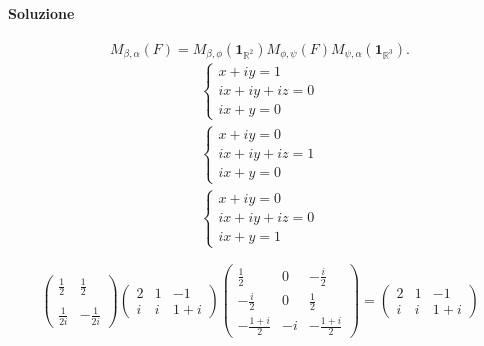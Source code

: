 \documentclass{article}
\theoremstyle{plain}
\theoremstyle{definition}
\theoremstyle{remark}
\begin{document}
\paragraph{Soluzione}
\[M_{\beta,\alpha}(F)=M_{\beta,\phi}(\mathbf{1}_{\mathbb{R}^2})M_{\phi,\psi}(F)M_{\psi,\alpha}(\mathbf{1}_{\mathbb{R}^3}).\]
\begin{align*}
\begin{cases}
    x+iy=1\\
    ix+iy+iz=0\\
    ix+y=0
\end{cases}\\
\begin{cases}
    x+iy=0\\
    ix+iy+iz=1\\
    ix+y=0
\end{cases}\\
\begin{cases}
    x+iy=0\\
    ix+iy+iz=0\\
    ix+y=1
\end{cases}    
\end{align*}

\[
\begin{pmatrix}
    \frac{1}{2}&\frac{1}{2}\\\\
    \frac{1}{2i}&-\frac{1}{2i}
\end{pmatrix}
\begin{pmatrix}
    2 & 1 & -1 \\
    i & i & 1+i
\end{pmatrix}
\begin{pmatrix}
    \frac{1}{2}&0&-\frac{i}{2}\\
    -\frac{i}{2}&0&\frac{1}{2}\\
    -\frac{1+i}{2}&-i&-\frac{1+i}{2}
\end{pmatrix}=
\begin{pmatrix}
    2 & 1 & -1 \\
    i & i & 1+i
\end{pmatrix}
\]

\vspace{10pt}
\end{document}
